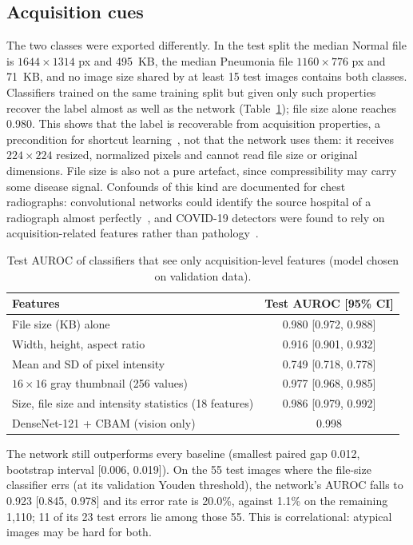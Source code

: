 \subsection{Acquisition cues}
The two classes were exported differently. In the test split the median Normal file is $1644\times1314$ px and
495~KB, the median Pneumonia file $1160\times776$ px and 71~KB, and no image size shared by at least 15 test
images contains both classes. Classifiers trained on the same training split but given only such properties
recover the label almost as well as the network (Table~\ref{tab:cue-baselines}); file size alone reaches
0.980. This shows that the label is recoverable from acquisition properties, a precondition for shortcut
learning~\cite{geirhos2020shortcut}, not that the network uses them: it receives $224\times224$ resized, normalized pixels and cannot read
file size or original dimensions. File size is also not a pure artefact, since compressibility may carry some
disease signal. Confounds of this kind are documented for chest radiographs: convolutional networks could
identify the source hospital of a radiograph almost perfectly~\cite{zech2018variable}, and COVID-19 detectors
were found to rely on acquisition-related features rather than pathology~\cite{degrave2020shortcuts}.

\begin{table}[htbp]
\centering
\caption{Test AUROC of classifiers that see only acquisition-level features (model chosen on validation data).}
\label{tab:cue-baselines}
\small
\begin{tabular}{lc}
\toprule
Features & Test AUROC [95\% CI] \\
\midrule
File size (KB) alone & 0.980 [0.972, 0.988] \\
Width, height, aspect ratio & 0.916 [0.901, 0.932] \\
Mean and SD of pixel intensity & 0.749 [0.718, 0.778] \\
$16\times16$ gray thumbnail (256 values) & 0.977 [0.968, 0.985] \\
Size, file size and intensity statistics (18 features) & 0.986 [0.979, 0.992] \\
DenseNet-121 + CBAM (vision only) & 0.998 \\
\bottomrule
\end{tabular}
\end{table}

The network still outperforms every baseline (smallest paired gap 0.012, bootstrap interval [0.006, 0.019]).
On the 55 test images where the file-size classifier errs (at its validation Youden threshold), the
network's AUROC falls to 0.923 [0.845, 0.978] and its error rate is 20.0\%, against 1.1\% on the remaining
1,110; 11 of its 23 test errors lie among those 55. This is correlational: atypical images may be hard for both.

